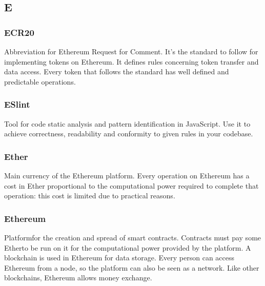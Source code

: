 \subsection*{E}

\subsubsection*{ECR20}
Abbreviation for Ethereum Request for Comment. It's the standard to follow for implementing tokens on Ethereum\glo.
It defines rules concerning token transfer and data access. Every token that follows the standard has well defined and predictable operations.


\subsubsection*{ESlint}
Tool for code static analysis and pattern identification in JavaScript. Use it to achieve correctness, readability and conformity to given rules in your codebase.

\subsubsection*{Ether}
Main currency of the Ethereum platform\glo. Every operation on Ethereum has a cost in Ether proportional to the computational power required to complete that operation: this cost is limited due to practical reasons. 

\subsubsection*{Ethereum}
Platform\glosp for the creation and spread of smart contracts\glo. Contracts must pay some Ether\glosp to be run on it for the computational power provided by the platform. A blockchain is used in Ethereum for data storage. Every person can access Ethereum from a node, so the platform can also be seen as a network. 
Like other blockchains, Ethereum allows money exchange.

